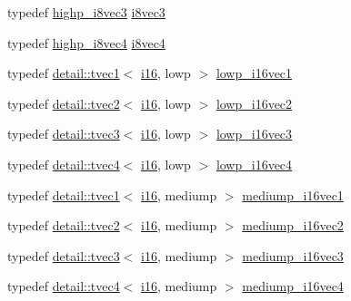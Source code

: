 \begin{DoxyCompactItemize}
typedef \hyperlink{group__gtc__type__precision_gad716792169ce7de963df25b865714438}{highp\+\_\+i8vec3} \hyperlink{group__gtc__type__precision_gae1e3127c58fbf1b6fbf28885cfd3dfad}{i8vec3}
\item 
typedef \hyperlink{group__gtc__type__precision_ga283b2f580a4bd7207d27418ef4a1068b}{highp\+\_\+i8vec4} \hyperlink{group__gtc__type__precision_ga89bb5e6481ae11fb2599b71e36a390bb}{i8vec4}
\item 
typedef \hyperlink{structglm_1_1detail_1_1tvec1}{detail\+::tvec1}$<$ \hyperlink{group__gtc__type__precision_ga35e5542ca05b29cc256fdafb8503d1fd}{i16}, lowp $>$ \hyperlink{group__gtc__type__precision_ga6f1e42c07424a2f14faf731c74ba2153}{lowp\+\_\+i16vec1}
\item 
typedef \hyperlink{structglm_1_1detail_1_1tvec2}{detail\+::tvec2}$<$ \hyperlink{group__gtc__type__precision_ga35e5542ca05b29cc256fdafb8503d1fd}{i16}, lowp $>$ \hyperlink{group__gtc__type__precision_ga47c5d4c919266799ecc76d832356feff}{lowp\+\_\+i16vec2}
\item 
typedef \hyperlink{structglm_1_1detail_1_1tvec3}{detail\+::tvec3}$<$ \hyperlink{group__gtc__type__precision_ga35e5542ca05b29cc256fdafb8503d1fd}{i16}, lowp $>$ \hyperlink{group__gtc__type__precision_ga5b71f24a26316aa21f3c58d25c8db9a8}{lowp\+\_\+i16vec3}
\item 
typedef \hyperlink{structglm_1_1detail_1_1tvec4}{detail\+::tvec4}$<$ \hyperlink{group__gtc__type__precision_ga35e5542ca05b29cc256fdafb8503d1fd}{i16}, lowp $>$ \hyperlink{group__gtc__type__precision_ga59ea63973187e1e990fb6633d1800c6d}{lowp\+\_\+i16vec4}
\item 
typedef \hyperlink{structglm_1_1detail_1_1tvec1}{detail\+::tvec1}$<$ \hyperlink{group__gtc__type__precision_ga35e5542ca05b29cc256fdafb8503d1fd}{i16}, mediump $>$ \hyperlink{group__gtc__type__precision_ga6a1d37139ea8990de24edf4bfa3500ad}{mediump\+\_\+i16vec1}
\item 
typedef \hyperlink{structglm_1_1detail_1_1tvec2}{detail\+::tvec2}$<$ \hyperlink{group__gtc__type__precision_ga35e5542ca05b29cc256fdafb8503d1fd}{i16}, mediump $>$ \hyperlink{group__gtc__type__precision_ga664a0266910df3c2d6559651f94d32e6}{mediump\+\_\+i16vec2}
\item 
typedef \hyperlink{structglm_1_1detail_1_1tvec3}{detail\+::tvec3}$<$ \hyperlink{group__gtc__type__precision_ga35e5542ca05b29cc256fdafb8503d1fd}{i16}, mediump $>$ \hyperlink{group__gtc__type__precision_gad9e470f707da812fe454505c99035471}{mediump\+\_\+i16vec3}
\item 
typedef \hyperlink{structglm_1_1detail_1_1tvec4}{detail\+::tvec4}$<$ \hyperlink{group__gtc__type__precision_ga35e5542ca05b29cc256fdafb8503d1fd}{i16}, mediump $>$ \hyperlink{group__gtc__type__precision_gad9aca299fc3e96c84be6b063381c9f3e}{mediump\+\_\+i16vec4}

\end{DoxyCompactItemize}
